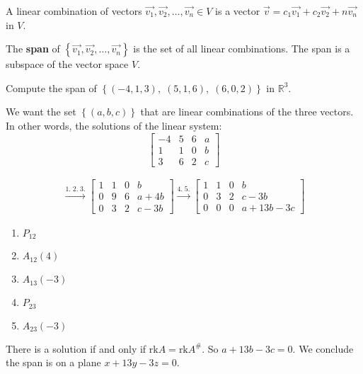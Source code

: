 \documentclass[../main.tex]{subfiles}
\begin{document}
\begin{definition}[Span]
    A linear combination of vectors \( \vec{v_1}, \vec{v_2}, \dots, \vec{v_n} \in V \) is a vector
    \( \vec{v} = c_1\vec{v_1} + c_2\vec{v_2} + n\vec{v_n} \) in \( V \).

    The \textbf{span} of \( \left\{ \vec{v_1}, \vec{v_2}, \dots, \vec{v_n} \right\} \) is the set of all linear combinations.
    The span is a subspace of the vector space \( V \).
\end{definition}

\begin{example}[]
    Compute the span of \( \left\{ (-4, 1, 3), \; (5,1,6), \; (6,0,2) \right\} \) in \( \mathbb{R}^3 \).

    We want the set \( \left\{ (a,b,c) \right\} \) that are linear combinations of the three vectors.
    In other words, the solutions of the linear system:
    \[ \begin{bmatrix}
        -4 & 5 & 6 & a \\
        1 & 1 & 0 & b \\
        3 & 6 & 2 & c
    \end{bmatrix} \]

    \begin{gather*}
        \xrightarrow[]{1. \; 2. \; 3.}
        \begin{bmatrix}
            1 & 1 & 0 & b \\
            0 & 9 & 6 & a+4b \\
            0 & 3 & 2 & c-3b
        \end{bmatrix}
        \xrightarrow[]{4. \; 5.}
        \begin{bmatrix}
            1 & 1 & 0 & b \\
            0 & 3 & 2 & c-3b \\
            0 & 0 & 0 & a+13b-3c
        \end{bmatrix}
    \end{gather*}
    \begin{enumerate}
        \item \( P_{12} \)
        \item \( A_{12}(4) \)
        \item \( A_{13}(-3) \)
        \item \( P_{23} \)
        \item \( A_{23}(-3) \)
    \end{enumerate}
    There is a solution if and only if \( \text{rk}A = \text{rk}A^\# \).
    So \( a+13b-3c = 0 \). We conclude the span is on a plane \( \boxed{x+13y-3z=0} \).
\end{example}
\end{document}
